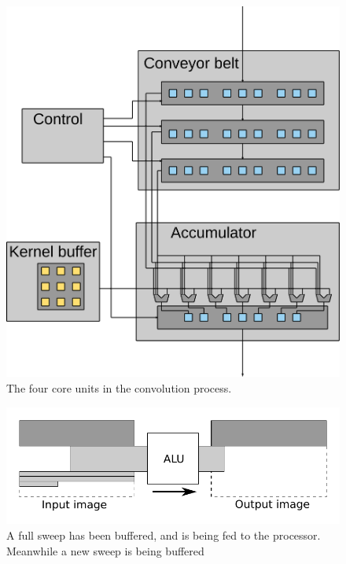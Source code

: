 \begin{figure}[h!]
    \includegraphics[width=\linewidth]{img/processor_overview.png}
    \caption{The four core units in the convolution process.}
    \label{fig:processor_core}
\end{figure}

\begin{figure}[h!]
    \includegraphics[width=\linewidth]{img/daisy_processing.pdf}
    \caption{A full sweep has been buffered, and is being fed to the processor. Meanwhile a new sweep is being buffered}
    \label{fig:sweep_feed}
\end{figure}

